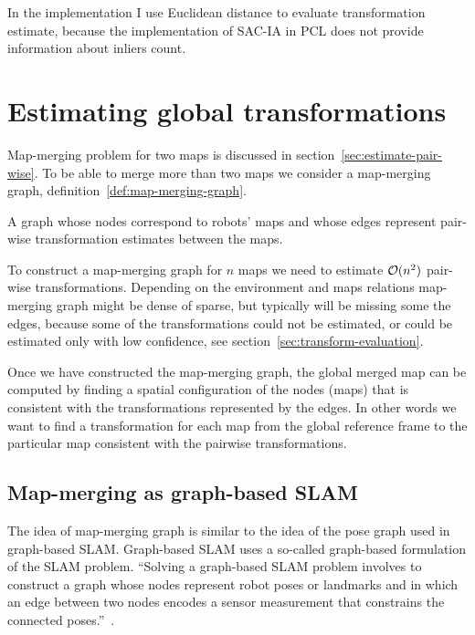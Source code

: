 In the implementation I use Euclidean distance to evaluate transformation estimate, because the implementation of \gls{SAC-IA} in \gls{PCL} does not provide information about inliers count.


\section{Estimating global transformations}
\label{sec:estimate-global}

Map-merging problem for two maps is discussed in section~\ref{sec:estimate-pair-wise}. To be able to merge more than two maps we consider a map-merging graph, definition~\ref{def:map-merging-graph}.

\begin{defn}
    \label{def:map-merging-graph}
    A graph whose nodes correspond to robots' maps and whose edges represent pair-wise transformation estimates between the maps.
\end{defn}

To construct a map-merging graph for $n$ maps we need to estimate $\operatorname{\mathcal{O}}(n^2)$ pair-wise transformations. Depending on the environment and maps relations map-merging graph might be dense of sparse, but typically will be missing some the edges, because some of the transformations could not be estimated, or could be estimated only with low confidence, see section~\ref{sec:transform-evaluation}.

Once we have constructed the map-merging graph, the global merged map can be computed by finding a spatial configuration of the nodes (maps) that is consistent with the transformations represented by the edges. In other words we want to find a transformation for each map from the global reference frame to the particular map consistent with the pairwise transformations.

\subsection{Map-merging as graph-based SLAM}

The idea of map-merging graph is similar to the idea of the pose graph used in graph-based \gls{SLAM}. Graph-based \gls{SLAM} uses a so-called graph-based formulation of the \gls{SLAM} problem. ``Solving a graph-based \gls{SLAM} problem involves to construct a graph whose nodes represent robot poses or landmarks and in which an edge between two nodes encodes a sensor measurement that constrains the connected poses.''~\citet{grisetti2010tutorial}.

